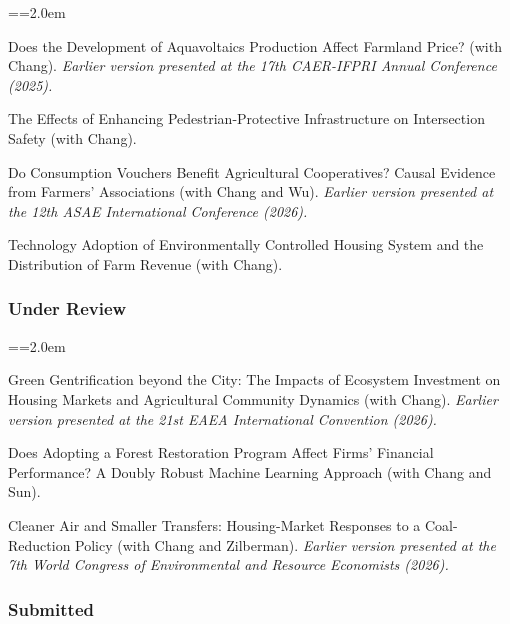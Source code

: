 \documentclass[11pt,letterpaper]{article}
\newenvironment{hanglist}{\par\setlength{\parindent}{0pt}\everypar={\hangindent=2.0em\hangafter=1}}{\par}
\begin{document}
\begin{hanglist}

Does the Development of Aquavoltaics Production Affect Farmland Price? (with Chang). \newline \textit{Earlier version presented at the 17th CAER-IFPRI Annual Conference (2025).}

The Effects of Enhancing Pedestrian-Protective Infrastructure on Intersection Safety (with Chang).

Do Consumption Vouchers Benefit Agricultural Cooperatives? Causal Evidence from Farmers' Associations (with Chang and Wu). \newline \textit{Earlier version presented at the 12th ASAE International Conference (2026).}

Technology Adoption of Environmentally Controlled Housing System and the Distribution of Farm Revenue (with Chang).

\end{hanglist}

\hypertarget{under-review}{%
\subsubsection{Under Review}\label{under-review}}

\begin{hanglist}

Green Gentrification beyond the City: The Impacts of Ecosystem Investment on Housing Markets and Agricultural Community Dynamics (with Chang). \newline \textit{Earlier version presented at the 21st EAEA International Convention (2026).}

Does Adopting a Forest Restoration Program Affect Firms' Financial Performance? A Doubly Robust Machine Learning Approach (with Chang and Sun).

Cleaner Air and Smaller Transfers: Housing-Market Responses to a Coal-Reduction Policy (with Chang and Zilberman). \newline \textit{Earlier version presented at the 7th World Congress of Environmental and Resource Economists (2026).}

\end{hanglist}

\hypertarget{submitted}{%
\subsubsection{Submitted}\label{submitted}}
\end{document}
